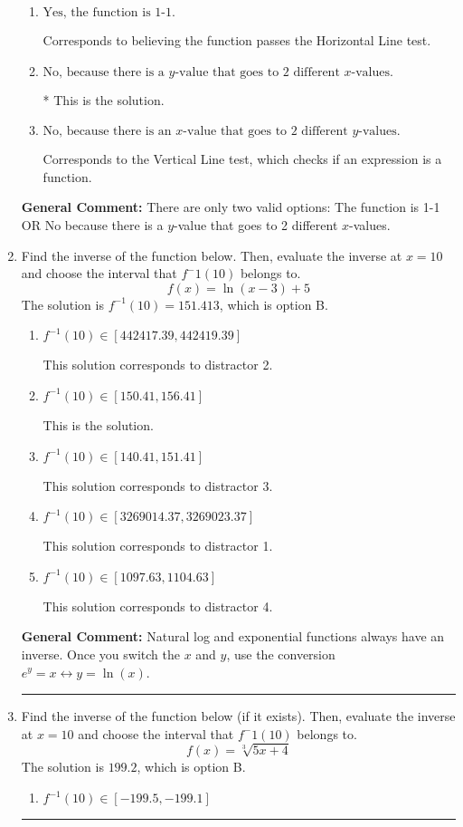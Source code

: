 \documentclass{extbook}[14pt]
\newcommand{\litem}[1]{\item #1

\rule{\textwidth}{0.4pt}}
\begin{document}
\begin{enumerate}
{\begin{enumerate}[label=\Alph*.]
Corresponds to believing 1-1 means the range is all Real numbers.
\item \( \text{Yes, the function is 1-1.} \)

Corresponds to believing the function passes the Horizontal Line test.
\item \( \text{No, because there is a $y$-value that goes to 2 different $x$-values.} \)

* This is the solution.
\item \( \text{No, because there is an $x$-value that goes to 2 different $y$-values.} \)

Corresponds to the Vertical Line test, which checks if an expression is a function.
\end{enumerate}

\textbf{General Comment:} There are only two valid options: The function is 1-1 OR No because there is a $y$-value that goes to 2 different $x$-values.
}
\litem{
Find the inverse of the function below. Then, evaluate the inverse at $x = 10$ and choose the interval that $f^-1(10)$ belongs to.
\[ f(x) = \ln{(x-3)}+5 \]The solution is \( f^{-1}(10) = 151.413 \), which is option B.\begin{enumerate}[label=\Alph*.]
\item \( f^{-1}(10) \in [442417.39, 442419.39] \)

 This solution corresponds to distractor 2.
\item \( f^{-1}(10) \in [150.41, 156.41] \)

 This is the solution.
\item \( f^{-1}(10) \in [140.41, 151.41] \)

 This solution corresponds to distractor 3.
\item \( f^{-1}(10) \in [3269014.37, 3269023.37] \)

 This solution corresponds to distractor 1.
\item \( f^{-1}(10) \in [1097.63, 1104.63] \)

 This solution corresponds to distractor 4.
\end{enumerate}

\textbf{General Comment:} Natural log and exponential functions always have an inverse. Once you switch the $x$ and $y$, use the conversion $ e^y = x \leftrightarrow y=\ln(x)$.
}
\litem{
Find the inverse of the function below (if it exists). Then, evaluate the inverse at $x = 10$ and choose the interval that $f^-1(10)$ belongs to.
\[ f(x) = \sqrt[3]{5 x + 4} \]The solution is \( 199.2 \), which is option B.\begin{enumerate}[label=\Alph*.]
\item \( f^{-1}(10) \in [-199.5, -199.1] \)


\end{enumerate}}
\end{enumerate}
\end{document}
